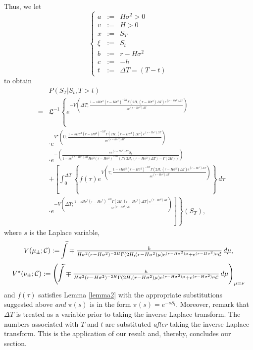 \documentclass[preprint, 12pt]{elsarticle}
\numberwithin{equation}{section}
\theoremstyle{plain}
\theoremstyle{remark}
\newcommand{\assign}{:=}
\newcommand{\nocomma}{}
\begin{document}
Thus, we let 
\[ \left\{ \begin{array}{lll}
     a & \assign & H\sigma^2 > 0\\
     v & \assign & H > 0\\
     x & \assign & S_T\\
     \xi & \assign & S_t\\
     b & \assign & r-H\sigma^2\\
     c & \assign & -h\\
     t & \assign & \Delta T=(T-t)
   \end{array} \right. \]
to obtain
\begin{eqnarray}
& & P(S_T | S_t, T>t) \nonumber\\
& = & \mathfrak{L}^{- 1} \left\{ e^{- V \left( \Delta T ; \frac{1 - s H\sigma^2 (r-H\sigma^2)^{- 2 H} \Gamma (2 H \nocomma, (r-H\sigma^2) \Delta T) e^{(r-H\sigma^2) \Delta T}}{s e^{(r-H\sigma^2)\Delta T}} \right)} \right. \nonumber \\ 
& & \cdot \displaystyle e^{V^{\star} \left( 0 ; \frac{1 - s H\sigma^2 (r-H\sigma^2)^{- 2 H} \Gamma (2 H \nocomma, (r-H\sigma^2)\Delta T)e^{(r-H\sigma^2)\Delta T}}{s e^{(r-H\sigma^2)\Delta T}} \right)} \nonumber \\
& & \cdot e^{-\left( \frac{s e^{(r-H\sigma^2)\Delta T} S_t}{1 - se^{(r-H\sigma^2)\Delta T} H\sigma^2 (r-H\sigma^2)^{-2H}  (\Gamma (2H \nocomma, (r-H\sigma^2) \Delta T)-\Gamma (2H \nocomma))} \right)} \nonumber\\
& & + \left[\displaystyle{\int_0^{\Delta T}{ \left\{ f (\tau) e^{V \left( \tau ; \frac{1 - s H\sigma^2 (r-H\sigma^2)^{- 2 H} \Gamma (2 H \nocomma, (r-H\sigma^2) \Delta T) e^{(r-H\sigma^2) \Delta T}}{s e^{(r-H\sigma^2)\Delta T}} \right)} \right\}\, d \tau}}\right.\nonumber\\
& & \left. \left. \cdot e^{-V \left( \Delta T ; \frac{1 - s H\sigma^2 (r-H\sigma^2)^{- 2 H} \Gamma (2 H \nocomma, (r-H\sigma^2) \Delta T) e^{(r-H\sigma^2) \Delta T}}{s e^{(r-H\sigma^2)\Delta T}} \right)}\right]\right\} \left(S_T\right) \nonumber,
\end{eqnarray}
where $s$ is the Laplace variable,
\[ V (\mu_{\pm} ; \mathcal{C}) \assign \kern6pt\widetilde{\kern-7pt\int} \mp \displaystyle{\tfrac{h}{H\sigma^2 (r-H\sigma^2)^{- 2 H} \Gamma (2 H, (r-H\sigma^2) \mu) e^{(r-H\sigma^2) \mu} +e^{(r-H\sigma^2)\mu} \mathcal{C}}\, d \mu},\]
\[V^{\star} (\nu_{\pm} ; \mathcal{C}) \assign \left( \kern6pt\widetilde{\kern-7pt\int} \mp \displaystyle{\tfrac{h}{H\sigma^2 (r-H\sigma^2)^{- 2 H} \Gamma (2 H, (r-H\sigma^2) \mu) e^{(r-H\sigma^2) \mu} +e^{(r-H\sigma^2)\mu} \mathcal{C}}\, d \mu} \right)_{\mu = \nu} \]
and $\displaystyle{f(\tau)}$ satisfies Lemma \ref{lemma2} with the appropriate substitutions suggested above \emph{and} $\displaystyle{\pi(s)}$ is in the form $\displaystyle{\pi(s) = e^{-s S_t}}$. Moreover, remark that $\displaystyle{\Delta T}$ is treated as a variable prior to taking the inverse Laplace transform. The numbers associated with $\displaystyle{T}$ and $\displaystyle{t}$ are substituted \emph{after} taking the inverse Laplace transform. This is the application of our result and, thereby, concludes our section.
\end{document}
